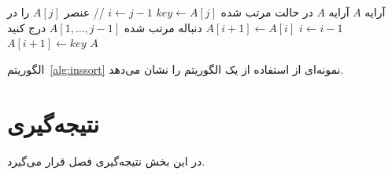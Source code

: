\begin{algorithm}[H] %
    \caption{\(\mathsf{Insertion Sort}(A)\)}
    \label{alg:inssort}
    \begin{algorithmic}[1]
        \REQUIRE آرایه \(A\)
        \ENSURE آرایه \(A\) در حالت مرتب شده
            \STATE \(key \gets A[j]\)
            \STATE \(i \gets j - 1\) \hfill // عنصر \(A[j]\) را در دنباله مرتب شده \(A[1,\ldots,j-1]\) درج کنید
                \STATE \(A[i + 1] \gets A[i]\)
                \STATE \(i \gets i-1\)
            \ENDWHILE{}
            \STATE \(A[i + 1] \gets key\)
        \ENDFOR{}
        \RETURN \(A\)
    \end{algorithmic}
\end{algorithm}

الگوریتم~\ref{alg:inssort} نمونه‌ای از استفاده از یک الگوریتم را نشان می‌دهد.

\section{نتیجه‌گیری}
در این بخش نتیجه‌گیری فصل قرار می‌گیرد.